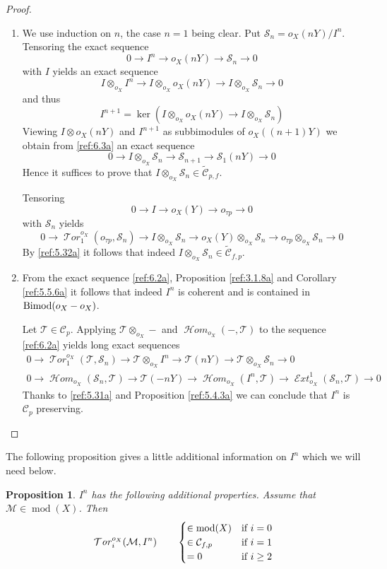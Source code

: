 \documentclass{amsproc}
\def\Cscr{{\mathcal C}}
\def\Escr{{\mathcal E}}
\def\Hscr{{\mathcal H}}
\def\Mscr{{\mathcal M}}
\def\Sscr{{\mathcal S}}
\def\Tscr{{\mathcal T}}
\def\HHom{\operatorname {\Hscr \mathit{om}}}
\def\HExt{\operatorname {\Escr \mathit{xt}}}
\def\HTor{\operatorname {\Tscr \mathit{or}}}
\def\Bimod{\mathop{\text{Bimod}}}
\def\HHom{\operatorname {\Hscr \mathit{om}}}
\def\HExt{\operatorname {\Escr \mathit{xt}}}
\def\HTor{\operatorname {\Tscr \mathit{or}}}
\def\ker{\operatorname {ker}}
\def\coh{\operatorname {mod}}
\def\r{\rightarrow}
\let\oldtext\text
\def\text#1{\oldtext{\upshape #1}}
\newtheorem{propositions}[lemmas]{Proposition}
\theoremstyle{definition}
\theoremstyle{remark}
\numberwithin{equation}{section}
\numberwithin{table}{section}
\numberwithin{figure}{section}
\begin{document}
\begin{proof}
\begin{enumerate}
\item
We use induction on $n$, the case $n=1$ being clear. Put
$\Sscr_n=o_X(nY)/{I^n}$. Tensoring the exact sequence
\begin{equation}
\label{ref:6.2a}
0\r {I^n}\r o_X(nY)\r \Sscr_n\r 0
\end{equation}
with ${I}$ yields an exact sequence
\[
{I}\otimes_{o_X} {I^n}\r {I} \otimes_{o_X} o_X(nY)\r {I}\otimes_{o_X} \Sscr_n\r 0
\]
and thus
\begin{equation}
\label{ref:6.3a}
I^{n+1}=\ker ({I} \otimes_{o_X} o_X(nY)\r {I}\otimes_{o_X} \Sscr_n)
\end{equation}
Viewing ${I}\otimes o_X(nY)$ and $I^{n+1}$ as subbimodules of
$o_X((n+1)Y)$ we obtain from \eqref{ref:6.3a} an exact sequence 
\[
0\r {I}\otimes_{o_X} \Sscr_n\r \Sscr_{n+1}\r \Sscr_1(nY)\r 0
\]
Hence it suffices to prove that ${I}\otimes_{o_X} \Sscr_n\in
\tilde{\Cscr}_{p,f}$.

Tensoring 
\[
0\r {I} \r o_X(Y)\r o_{\tau p}\r 0
\]
with $\Sscr_n$ yields
\[
0\r \HTor_1^{o_X}(o_{\tau p},\Sscr_n)\r {I}\otimes_{o_X} \Sscr_n \r
o_X(Y)\otimes_{o_X} \Sscr_n\r o_{\tau p}\otimes_{o_X} \Sscr_n\r 0
\]
By \eqref{ref:5.32a} it follows that indeed ${I}\otimes_{o_X} \Sscr_n\in
\tilde{\Cscr}_{f,p}$.
\item
From the exact sequence \eqref{ref:6.2a}, Proposition \ref{ref:3.1.8a}
and  Corollary
\ref{ref:5.5.6a} it
follows that indeed $I^{n}$ is coherent and is contained in
$\Bimod(o_X-o_X)$. 

Let $\Tscr\in \Cscr_p$. Applying $\Tscr\otimes_{o_X}-$ and
$\HHom_{o_X}(-,\Tscr)$ to the sequence \eqref{ref:6.2a} yields long
exact sequences
\begin{gather*}
0\r\HTor_1^{o_X}(\Tscr,\Sscr_n)\r \Tscr\otimes_{o_X} {I^n}
\r
\Tscr(nY)\r \Tscr\otimes_{o_X} \Sscr_n\r 0
\\
0\r\HHom_{o_X}(\Sscr_n,\Tscr)\r \Tscr(-nY)\r \HHom_{o_X}({I^n},\Tscr)\r
\HExt^1_{o_X}(\Sscr_n,\Tscr)\r 0
\end{gather*}
Thanks to \eqref{ref:5.31a} and Proposition \ref{ref:5.4.3a} we can
conclude that ${I^n}$ is $\Cscr_p$ preserving.
\end{enumerate}
\def\qed{}\end{proof} The following proposition gives a little
additional information on ${I^n}$ which we will need below.
\begin{propositions} 
\label{ref:6.1.2a}
${I^n}$  has the following additional properties. Assume that
$\Mscr\in \coh(X)$. Then
\[
\HTor_i^{o_X}(\Mscr,{I^n})\qquad
\begin{cases}
\in \coh(X) &\text{if $i=0$}\\
\in \Cscr_{f,p}&\text{if $i=1$}\\
=0&\text{if $i\ge 2$}
\end{cases}
\]
\end{propositions}
\end{document}
